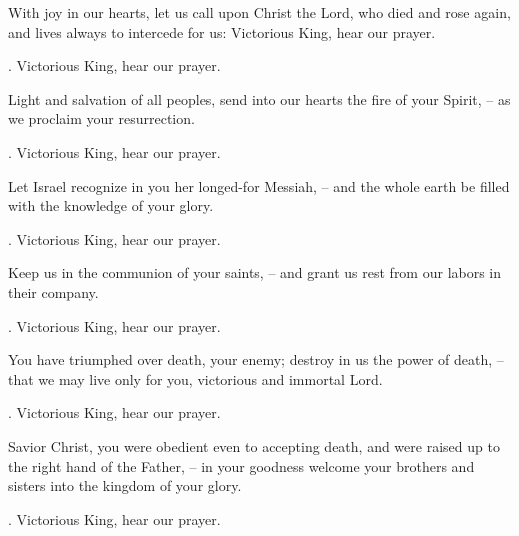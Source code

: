 \lettrine[loversize=0.15,lines=2]{W}{}ith joy in our hearts, let us call upon Christ the Lord, who died and rose again, and lives always to intercede for us: Victorious King, hear our prayer.
\par \Rbar. Victorious King, hear our prayer.

Light and salvation of all peoples, send into our hearts the fire of your Spirit,
– as we proclaim your resurrection.
\par \Rbar. Victorious King, hear our prayer.

Let Israel recognize in you her longed-for Messiah,
– and the whole earth be filled with the knowledge of your glory.
\par \Rbar. Victorious King, hear our prayer.

Keep us in the communion of your saints,
– and grant us rest from our labors in their company.
\par \Rbar. Victorious King, hear our prayer.

You have triumphed over death, your enemy; destroy in us the power of death,
– that we may live only for you, victorious and immortal Lord.
\par \Rbar. Victorious King, hear our prayer.

Savior Christ, you were obedient even to accepting death, and were raised up to the right hand of the Father,
– in your goodness welcome your brothers and sisters into the kingdom of your glory.
\par \Rbar. Victorious King, hear our prayer.